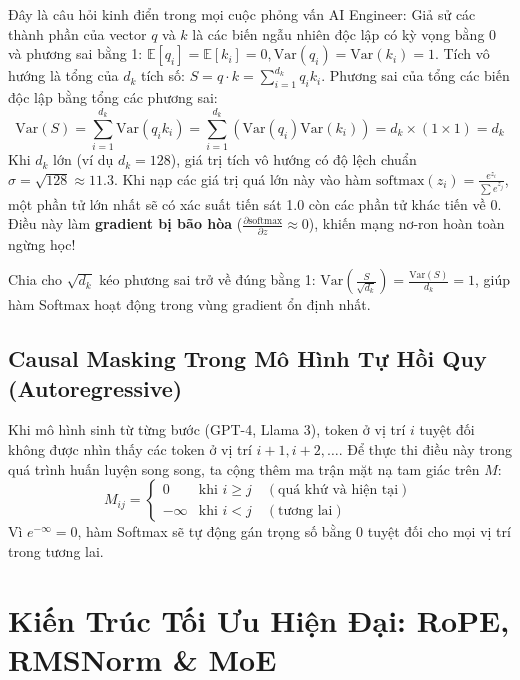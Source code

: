 \begin{guidelinebox}
Đây là câu hỏi kinh điển trong mọi cuộc phỏng vấn AI Engineer:
Giả sử các thành phần của vector $q$ và $k$ là các biến ngẫu nhiên độc lập có kỳ vọng bằng 0 và phương sai bằng 1: $\mathbb{E}[q_i] = \mathbb{E}[k_i] = 0, \text{Var}(q_i) = \text{Var}(k_i) = 1$.
Tích vô hướng là tổng của $d_k$ tích số: $S = q \cdot k = \sum_{i=1}^{d_k} q_i k_i$.
Phương sai của tổng các biến độc lập bằng tổng các phương sai:
\begin{equation}
\text{Var}(S) = \sum_{i=1}^{d_k} \text{Var}(q_i k_i) = \sum_{i=1}^{d_k} \left(\text{Var}(q_i)\text{Var}(k_i)\right) = d_k \times (1 \times 1) = d_k
\end{equation}
Khi $d_k$ lớn (ví dụ $d_k = 128$), giá trị tích vô hướng có độ lệch chuẩn $\sigma = \sqrt{128} \approx 11.3$. Khi nạp các giá trị quá lớn này vào hàm $\text{softmax}(z_i) = \frac{e^{z_i}}{\sum e^{z_j}}$, một phần tử lớn nhất sẽ có xác suất tiến sát 1.0 còn các phần tử khác tiến về 0. Điều này làm \textbf{gradient bị bão hòa} ($\frac{\partial \text{softmax}}{\partial z} \approx 0$), khiến mạng nơ-ron hoàn toàn ngừng học! 

Chia cho $\sqrt{d_k}$ kéo phương sai trở về đúng bằng 1: $\text{Var}\left(\frac{S}{\sqrt{d_k}}\right) = \frac{\text{Var}(S)}{d_k} = 1$, giúp hàm Softmax hoạt động trong vùng gradient ổn định nhất.
\end{guidelinebox}

\subsection{Causal Masking Trong Mô Hình Tự Hồi Quy (Autoregressive)}
Khi mô hình sinh từ từng bước (GPT-4, Llama 3), token ở vị trí $i$ tuyệt đối không được nhìn thấy các token ở vị trí $i+1, i+2, \dots$. Để thực thi điều này trong quá trình huấn luyện song song, ta cộng thêm ma trận mặt nạ tam giác trên $M$:
\begin{equation}
M_{ij} = \begin{cases} 
0 & \text{khi } i \ge j \quad (\text{quá khứ và hiện tại}) \\
-\infty & \text{khi } i < j \quad (\text{tương lai})
\end{cases}
\end{equation}
Vì $e^{-\infty} = 0$, hàm Softmax sẽ tự động gán trọng số bằng 0 tuyệt đối cho mọi vị trí trong tương lai.

\section{Kiến Trúc Tối Ưu Hiện Đại: RoPE, RMSNorm \& MoE}

